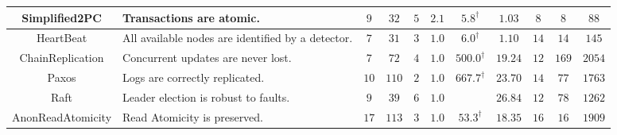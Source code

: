 \begin{table}[t!]
\begin{tabular}{c|P{4.0cm}||ccc||cc||c|ccc}
  \midrule
  {\scriptsize\textsf{Simplified2PC}}\cite{DGJ+13} & {\scriptsize Transactions are atomic.} & $9$ & $32$ & $5$ & $2.1$ & $5.8^{\dagger}$ & $1.03$ & $8$ & $8$ & $88$\\
  \midrule
  {\scriptsize\textsf{HeartBeat}}\cite{DGJ+13} & {\scriptsize All available nodes are identified by a  detector.} & $7$ & $31$ & $3$ & $1.0$ & $6.0^{\dagger}$ & $1.10$ & $14$ & $14$ & $145$\\
  \midrule
  {\scriptsize\textsf{ChainReplication}}\cite{ModP} & {\scriptsize Concurrent updates are never lost.} & $7$ & $72$ & $4$ & $1.0$ & $500.0^{\dagger}$ & $19.24$ & $12$ & $169$ & $2054$\\
  \midrule
  {\scriptsize\textsf{Paxos}}\cite{ModP} & {\scriptsize Logs are correctly replicated.} & $10$ & $110$ & $2$ & $1.0$ & $667.7^{\dagger}$ & $23.70$ & $14$ & $77$ & $1763$\\
  \midrule
  {\scriptsize\textsf{Raft}} & {\scriptsize Leader election is robust to faults.} & $9$ & $39$ & $6$ & $1.0$ & \timeout{} & $26.84$ & $12$ & $78$ & $1262$\\
  \midrule
  {\scriptsize\textsf{AnonReadAtomicity}} & {\scriptsize Read Atomicity is preserved.} & $17$ & $113$ & $3$ & $1.0$ & $53.3^{\dagger}$ & $18.35$ & $16$ & $16$ & $1909$\\
\bottomrule
  \end{tabular}
\label{tab:evaluation2}
\vspace*{-.15in}
\end{table}

